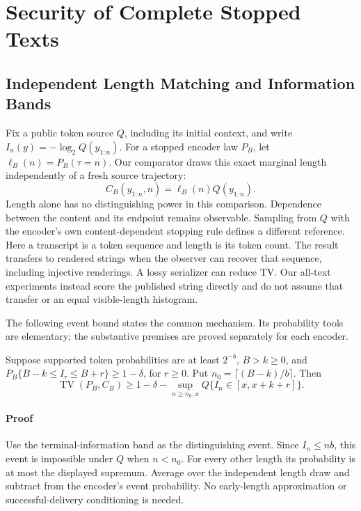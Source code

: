 \section{Security of Complete Stopped Texts}
\label{sec:stopping}

\subsection{Independent Length Matching and Information Bands}

Fix a public token source $Q$, including its initial context, and write
$I_n(y)=-\log_2 Q(y_{1:n})$. For a stopped encoder law $P_B$, let
$\ell_B(n)=P_B(\tau=n)$. Our comparator draws this exact marginal length
independently of a fresh source trajectory:
\begin{equation}
 C_B(y_{1:n},n)=\ell_B(n)Q(y_{1:n}).
 \label{eq:independent-length}
\end{equation}
Length alone has no distinguishing power in this comparison. Dependence between
the content and its endpoint remains observable. Sampling from $Q$ with the
encoder's own content-dependent stopping rule defines a different reference.
Here a transcript is a token sequence and length is its token count. The
result transfers to rendered strings when the observer can recover that
sequence, including injective renderings. A lossy serializer can reduce TV.
Our all-text experiments instead score the published string directly and
do not assume that transfer or an equal visible-length histogram.

The following event bound states the common mechanism. Its probability tools
are elementary; the substantive premises are proved separately for each encoder.

\begin{theorem}
\label{thm:criterion}
Suppose supported token probabilities are at least $2^{-b}$, $B>k\ge0$, and
$P_B\{B-k\le I_\tau\le B+r\}\ge1-\delta$, for $r\ge0$. Put
$n_0=\lceil(B-k)/b\rceil$. Then
\begin{equation}
 \operatorname{TV}(P_B,C_B)\ge1-\delta-
 \sup_{n\ge n_0,x}Q\{I_n\in[x,x+k+r]\}.
 \label{eq:band-criterion}
\end{equation}
\end{theorem}

\paragraph{Proof}
Use the terminal-information band as the distinguishing event. Since
$I_n\le nb$, this event is impossible under $Q$ when $n<n_0$. For every other
length its probability is at most the displayed supremum. Average over the
independent length draw and subtract from the encoder's event probability.
No early-length approximation or successful-delivery conditioning is needed.

